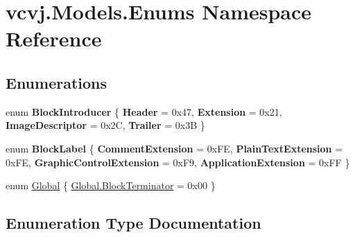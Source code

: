 \hypertarget{namespacevcvj_1_1_models_1_1_enums}{}\section{vcvj.\+Models.\+Enums Namespace Reference}
\label{namespacevcvj_1_1_models_1_1_enums}
\subsection*{Enumerations}
\begin{DoxyCompactItemize}
\item 
enum {\bfseries Block\+Introducer} \{ {\bfseries Header} = 0x47, 
{\bfseries Extension} = 0x21, 
{\bfseries Image\+Descriptor} = 0x2C, 
{\bfseries Trailer} = 0x3B
 \}\hypertarget{namespacevcvj_1_1_models_1_1_enums_ab3df44b2ca74d17384a0be507a03c856}{}\label{namespacevcvj_1_1_models_1_1_enums_ab3df44b2ca74d17384a0be507a03c856}

\item 
enum {\bfseries Block\+Label} \{ {\bfseries Comment\+Extension} = 0x\+FE, 
{\bfseries Plain\+Text\+Extension} = 0x\+FE, 
{\bfseries Graphic\+Control\+Extension} = 0x\+F9, 
{\bfseries Application\+Extension} = 0x\+FF
 \}\hypertarget{namespacevcvj_1_1_models_1_1_enums_a8a1d51f6986c89354136ac4190430072}{}\label{namespacevcvj_1_1_models_1_1_enums_a8a1d51f6986c89354136ac4190430072}

\item 
enum \hyperlink{namespacevcvj_1_1_models_1_1_enums_a66883ab099954ca74d969bc1ddff93ae}{Global} \{ \hyperlink{namespacevcvj_1_1_models_1_1_enums_a66883ab099954ca74d969bc1ddff93aea0b41080437e189d85495d939c5bbdb13}{Global.\+Block\+Terminator} = 0x00
 \}
\end{DoxyCompactItemize}


\subsection{Enumeration Type Documentation}
